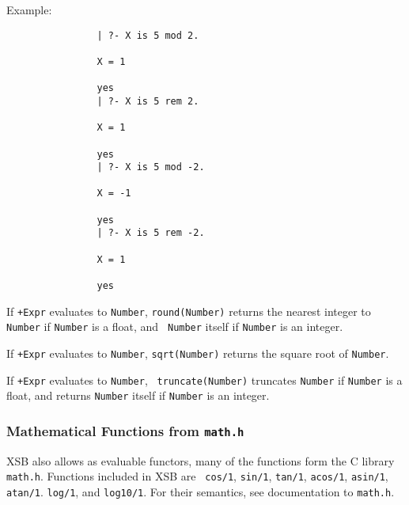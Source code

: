 \begin{description}
    Example:
    {\footnotesize
     \begin{verbatim}
                | ?- X is 5 mod 2.

                X = 1

                yes
                | ?- X is 5 rem 2.

                X = 1

                yes
                | ?- X is 5 mod -2.

                X = -1

                yes
                | ?- X is 5 rem -2.

                X = 1

                yes
  \end{verbatim}}

 If
{\tt +Expr} evaluates to {\tt Number}, {\tt round(Number)} returns the
nearest integer to {\tt Number} if {\tt Number} is a float, and {\tt
Number} itself if {\tt Number} is an integer.

If {\tt +Expr} evaluates to {\tt Number}, {\tt sqrt(Number)}
returns the square root of {\tt Number}.

 If {\tt +Expr} evaluates to {\tt Number}, {\tt
truncate(Number)} truncates {\tt Number} if {\tt Number} is a float,
and returns {\tt Number} itself if {\tt Number} is an integer.
\end{description}

\subsubsection{Mathematical Functions from {\tt math.h}}
  
  
 

XSB also allows as evaluable functors, many of the functions form the
C library {\tt math.h}.  Functions included in XSB \version{} are {\tt
cos/1}, {\tt sin/1}, {\tt tan/1}, {\tt acos/1}, {\tt asin/1}, {\tt
atan/1}. {\tt log/1}, and {\tt log10/1}.  For their semantics, see
documentation to {\tt math.h}.

